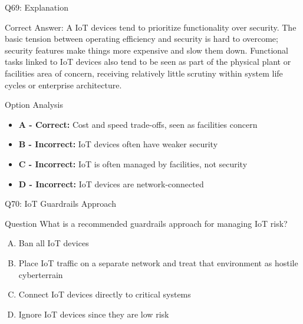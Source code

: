 \documentclass{beamer}
\begin{document}
	\begin{frame}{Q69: Explanation}
		\begin{block}{Correct Answer: A}
			IoT devices tend to prioritize functionality over security. The basic tension between operating efficiency and security is hard to overcome; security features make things more expensive and slow them down. Functional tasks linked to IoT devices also tend to be seen as part of the physical plant or facilities area of concern, receiving relatively little scrutiny within system life cycles or enterprise architecture.
		\end{block}
		\begin{block}{Option Analysis}
			\begin{itemize}
				\item \textbf{A - Correct:} Cost and speed trade-offs, seen as facilities concern
				\item \textbf{B - Incorrect:} IoT devices often have weaker security
				\item \textbf{C - Incorrect:} IoT is often managed by facilities, not security
				\item \textbf{D - Incorrect:} IoT devices are network-connected
			\end{itemize}
		\end{block}
	\end{frame}
	
	\begin{frame}{Q70: IoT Guardrails Approach}
		\begin{block}{Question}
			What is a recommended guardrails approach for managing IoT risk?
		\end{block}
		\begin{enumerate}[(A)]
			\item Ban all IoT devices
			\item Place IoT traffic on a separate network and treat that environment as hostile cyberterrain
			\item Connect IoT devices directly to critical systems
			\item Ignore IoT devices since they are low risk
		\end{enumerate}
	\end{frame}
	
\end{document}
